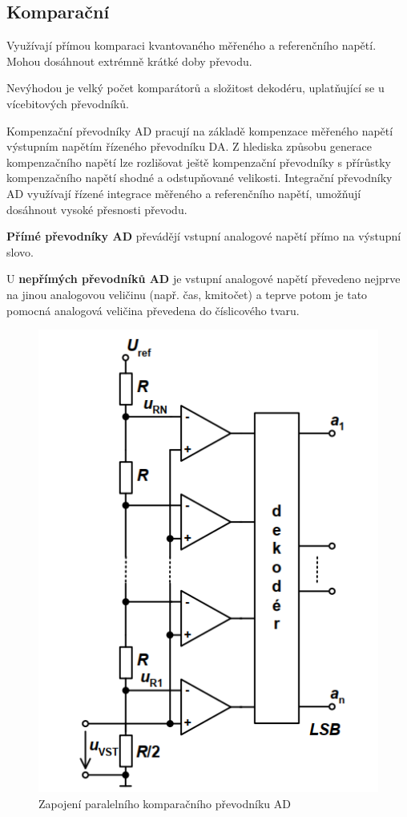 \subsection{Komparační}
Využívají přímou komparaci kvantovaného měřeného a referenčního napětí. Mohou dosáhnout extrémně krátké doby převodu. 

Nevýhodou je velký počet komparátorů a složitost dekodéru, uplatňující se u vícebitových převodníků. 

Kompenzační převodníky AD pracují na základě kompenzace měřeného napětí výstupním napětím řízeného převodníku DA. Z hlediska způsobu generace kompenzačního napětí lze rozlišovat ještě kompenzační převodníky s přírůstky kompenzačního napětí shodné a odstupňované velikosti. Integrační převodníky AD využívají řízené integrace měřeného a referenčního napětí, umožňují dosáhnout vysoké přesnosti převodu.

\textbf{Přímé převodníky AD} převádějí vstupní analogové napětí přímo na výstupní slovo. 

U \textbf{nepřímých převodníků AD} je vstupní analogové napětí převedeno nejprve na jinou analogovou veličinu (např. čas, kmitočet) a teprve potom je tato pomocná analogová veličina převedena do číslicového tvaru.
\begin{figure}[h]
   \begin{center}
     \includegraphics[scale=0.6]{images/ADkomp.png}
   \end{center}
   \caption{Zapojení paralelního komparačního převodníku AD}
\end{figure}

